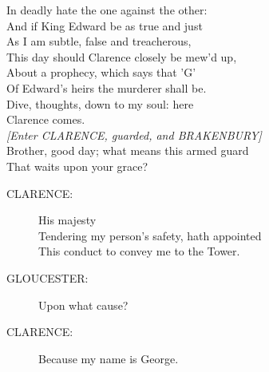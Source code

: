 \documentclass{article}
\begin{document}
\begin{description}
\hspace{1pt}In deadly hate the one against the other:\\
\hspace{1pt}And if King Edward be as true and just\\
\hspace{1pt}As I am subtle, false and treacherous,\\
\hspace{1pt}This day should Clarence closely be mew'd up,\\
\hspace{1pt}About a prophecy, which says that 'G'\\
\hspace{1pt}Of Edward's heirs the murderer shall be.\\
\hspace{1pt}Dive, thoughts, down to my soul: here\\
\hspace{1pt}Clarence comes.\\
{\it [Enter CLARENCE, guarded, and BRAKENBURY]}\\
\hspace{1pt}Brother, good day; what means this armed guard\\
\hspace{1pt}That waits upon your grace?\\
\end{description}
\begin{description}
\item[CLARENCE:] 
\hspace{1pt}His majesty\\
\hspace{1pt}Tendering my person's safety, hath appointed\\
\hspace{1pt}This conduct to convey me to the Tower.\\
\end{description}
\begin{description}
\item[GLOUCESTER:] 
\hspace{1pt}Upon what cause?\\
\end{description}
\begin{description}
\item[CLARENCE:] 
\hspace{1pt}Because my name is George.\\
\end{description}
\end{document}
